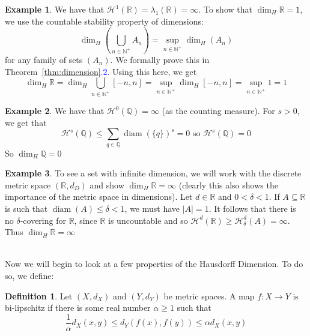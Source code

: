 \documentclass{article}
\theoremstyle{plain}
\theoremstyle{definition}
\newtheorem{defn}[thm]{Definition}
\newtheorem*{ex}{Example}
\DeclareMathOperator{\diam}{diam}
\theoremstyle{remark}
\begin{document}
\begin{ex}
    We have that $\mathcal{H}^1(\mathbb{R}) = \lambda _1(\mathbb{R}) = \infty$. To show that $\dim_H \mathbb{R} = 1$, we use the countable stability property of dimensions: \[
    \dim_H \left (\bigcup \limits _{n \in \mathbb{N}^+} A_n\right ) = \sup \limits _{n \in \mathbb{N}^+} \dim_H (A_n)
    \] for any family of sets $(A_n)$. We formally prove this in Theorem~\ref{thm:dimension}\textcolor{blue}{.2.} Using this here, we get \[\dim_H \mathbb{R} = \dim_H \bigcup \limits _{n \in \mathbb{N}^+} [-n,n] = \sup \limits _{n \in \mathbb{N}^+ } \dim_H [-n,n] = \sup \limits _{n \in \mathbb{N}^+}1=1\]
\end{ex}
\begin{ex}
    We have that $\mathcal{H}^0 (\mathbb{Q}) = \infty$ (as the counting measure). For $s > 0$, we get that \[\mathcal{H}^s(\mathbb{Q}) \le \sum \limits _{q \in \mathbb{Q}} \diam (\{q\})^s = 0 \text{ so } \mathcal{H}^s(\mathbb{Q}) = 0\]
    So $\dim_H \mathbb{Q} = 0$
\end{ex}

\begin{ex}
    To see a set with infinite dimension, we will work with the discrete metric space $(\mathbb{R}, d_D)$ and show $\dim_H \mathbb{R} = \infty$ (clearly this also shows the importance of the metric space in dimensions). Let $d \in \mathbb{R}$ and $0 < \delta < 1$. If $A \subseteq \mathbb{R}$ is such that $\diam (A) \le \delta < 1$, we must have $|A| = 1$. It follows that there is no $\delta $-covering for $\mathbb{R}$, since $\mathbb{R}$ is uncountable and so $\mathcal{H}^d(\mathbb{R}) \ge \mathcal{H}^d_\delta (A) = \infty$. Thus $\dim_H \mathbb{R} = \infty $
\end{ex}

\noindent{}
~\\
Now we will begin to look at a few properties of the Hausdorff Dimension. To do so, we define:

\begin{defn}
    Let $(X,d_X)$ and $(Y, d_Y)$ be metric spaces. A map $f: X\to Y$ is bi-lipschitz if there is some real number $\alpha \ge 1$ such that \[\frac{1}{\alpha} d_X(x,y)\le d_Y(f(x), f(y))\le \alpha d_X(x,y)\]
\end{defn}
\end{document}
